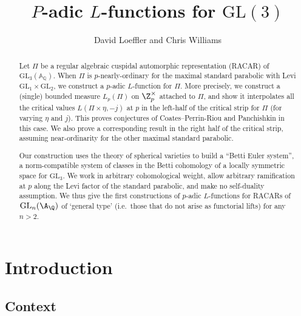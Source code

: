 \documentclass[10pt,reqno,a4paper]{amsart}
\title{$P$-adic $L$-functions for $\mathrm{GL}(3)$}
\author{David Loeffler and Chris Williams}
\begin{document}
\begin{abstract}
	Let $\Pi$ be a regular algebraic cuspidal automorphic representation (RACAR) of $\mathrm{GL}_3(\mathbb{A}_{\mathbb{Q}})$. When $\Pi$ is $p$-nearly-ordinary for the maximal standard parabolic with Levi $\mathrm{GL}_1 \times \mathrm{GL}_2$, we construct a $p$-adic $L$-function for $\Pi$. More precisely, we construct a (single) bounded measure $L_p(\Pi)$ on $\Z_p^\times$ attached to $\Pi$, and show it interpolates all the critical values $L(\Pi\times\eta,-j)$ at $p$ in the left-half of the critical strip for $\Pi$ (for varying $\eta$ and $j$). This proves conjectures of Coates--Perrin-Riou and Panchishkin in this case. We also prove a corresponding result in the right half of the critical strip, assuming near-ordinarity for the other maximal standard parabolic.

 Our construction uses the theory of spherical varieties to build a ``Betti Euler system'', a norm-compatible system of classes in the Betti cohomology of a locally symmetric space for $\mathrm{GL}_3$. We work in arbitrary cohomological weight, allow arbitrary ramification at $p$ along the Levi factor of the standard parabolic, and make no self-duality assumption.  We thus give the first constructions of $p$-adic $L$-functions for RACARs of $\mathrm{GL}_n(\A_{\Q})$ of `general type' (i.e.\ those that do not arise as functorial lifts) for any $n >2$.
\end{abstract}

\maketitle




%
%



%
%

\section{Introduction}

\subsection{Context}
\end{document}
